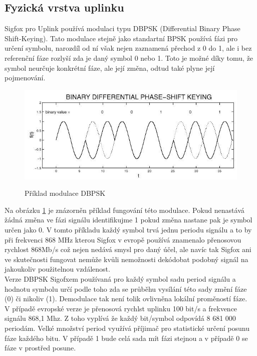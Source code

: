 \documentclass{ctuthesis}
\begin{document}
\subsection{Fyzická vrstva uplinku}
Sigfox pro Uplink používá modulaci typu DBPSK (Differential Binary Phase Shift-Keying). Tato modulace stejně jako standartní BPSK používá fázi pro určení symbolu, narozdíl od ní však nejen zaznamená přechod z 0 do 1, ale i bez referenční fáze rozlyší zda je daný symbol 0 nebo 1. Toto je možné díky tomu, že symbol neurčuje konkrétní fáze, ale její změna, odtud také plyne její pojmenování. \\
\begin{figure}
\caption{Příklad modulace DBPSK \cite{dbpsk}}
\includegraphics[width=1\textwidth]{./images/dbpsk.jpg}
\label{dbpsk}
\end{figure}
Na obrázku \ref{dbpsk} je znázorněn příklad fungování této modulace. Pokud nenastává žádná změna ve fázi signálu identifikujme 1 pokud změna nastane pak je symbol určen jako 0. V tomto příkladu každý symbol trvá jednu periodu signálu a to by při frekvenci 868 MHz kterou Sigfox v evropě používá znamenalo přenosovou rychlost 868Mb/s což nejen nedává smysl pro daný účel, ale navíc tak Sigfox ani ve skutečnosti fungovat nemůže kvůli nemožnosti dekódobat podobný signál na jakoukoliv použitelnou vzdálenost.\\
Verze DBPSK Sigofxem používaná pro každý symbol sadu period signálu a hodnotu symbolu určí podle toho zda se průběhu vysílání této sady změní fáze (0) či nikoliv (1). Demodulace tak není tolik ovlivněna lokální proměností fáze.\\
V případě evropské verze je přenosová rychlst uplinku 100 bit/s a frekvence signálu 868,1 Mhz. Z toho vyplívá že každý bit/symbol odpovídá 8 681 000 periodám. Velké množství period využívá příjimač pro statistické určení posunu fáze každého bitu. V případě 1 bude celá sada mít fázi stejnou a v případě 0 se fáze v prostřed posune. \\
\end{document}
